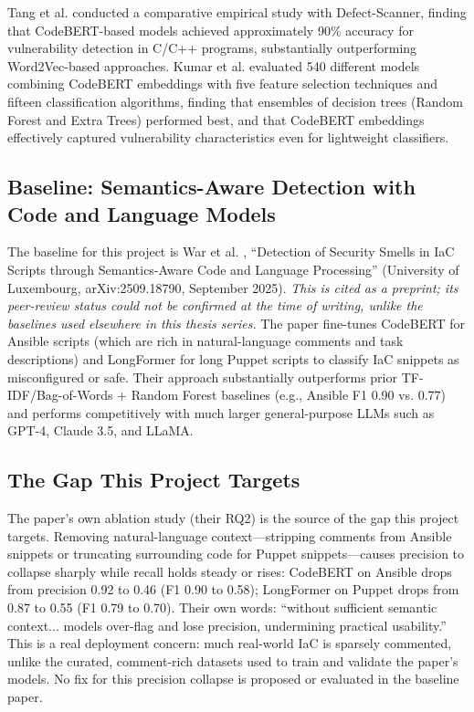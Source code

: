 Tang et al. \cite{Tang24} conducted a comparative empirical study with Defect-Scanner, finding that CodeBERT-based models achieved approximately 90\% accuracy for vulnerability detection in C/C++ programs, substantially outperforming Word2Vec-based approaches. Kumar et al. \cite{Kumar24b} evaluated 540 different models combining CodeBERT embeddings with five feature selection techniques and fifteen classification algorithms, finding that ensembles of decision trees (Random Forest and Extra Trees) performed best, and that CodeBERT embeddings effectively captured vulnerability characteristics even for lightweight classifiers.

\subsection{Baseline: Semantics-Aware Detection with Code and Language Models}

The baseline for this project is War et al. \cite{War25}, ``Detection of Security Smells in IaC Scripts through Semantics-Aware Code and Language Processing'' (University of Luxembourg, arXiv:2509.18790, September 2025). \emph{This is cited as a preprint; its peer-review status could not be confirmed at the time of writing, unlike the baselines used elsewhere in this thesis series.} The paper fine-tunes CodeBERT for Ansible scripts (which are rich in natural-language comments and task descriptions) and LongFormer for long Puppet scripts to classify IaC snippets as misconfigured or safe. Their approach substantially outperforms prior TF-IDF/Bag-of-Words + Random Forest baselines (e.g., Ansible F1 0.90 vs. 0.77) and performs competitively with much larger general-purpose LLMs such as GPT-4, Claude 3.5, and LLaMA.

\subsection{The Gap This Project Targets}

The paper's own ablation study (their RQ2) is the source of the gap this project targets. Removing natural-language context—stripping comments from Ansible snippets or truncating surrounding code for Puppet snippets—causes precision to collapse sharply while recall holds steady or rises: CodeBERT on Ansible drops from precision 0.92 to 0.46 (F1 0.90 to 0.58); LongFormer on Puppet drops from 0.87 to 0.55 (F1 0.79 to 0.70). Their own words: ``without sufficient semantic context... models over-flag and lose precision, undermining practical usability.'' This is a real deployment concern: much real-world IaC is sparsely commented, unlike the curated, comment-rich datasets used to train and validate the paper's models. No fix for this precision collapse is proposed or evaluated in the baseline paper.

